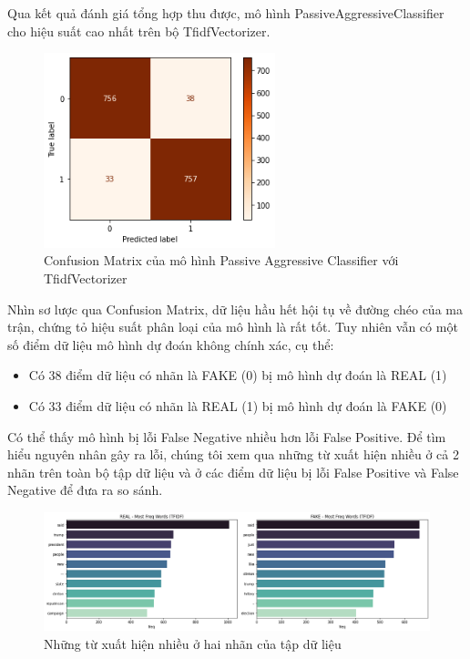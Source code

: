 \documentclass[12pt,a4paper,oneside]{book}
\begin{document}
Qua kết quả đánh giá tổng hợp thu được, mô hình PassiveAggressiveClassifier cho hiệu suất cao nhất trên bộ TfidfVectorizer.
\begin{figure}[H]
	\centering
	\captionsetup{width=0.6\textwidth}
	\includegraphics[width=0.6\textwidth]{tfpa_2}
	\caption{Confusion Matrix của mô hình Passive Aggressive Classifier với TfidfVectorizer}
\end{figure}
Nhìn sơ lược qua Confusion Matrix, dữ liệu hầu hết hội tụ về đường chéo của ma trận, chứng tỏ hiệu suất phân loại của mô hình là rất tốt. Tuy nhiên vẫn có một số điểm dữ liệu mô hình dự đoán không chính xác, cụ thể:
\begin{itemize}
\item Có 38 điểm dữ liệu có nhãn là FAKE (0) bị mô hình dự đoán là REAL (1)
\item Có 33 điểm dữ liệu có nhãn là REAL (1) bị mô hình dự đoán là FAKE (0)
\end{itemize}

Có thể thấy mô hình bị lỗi False Negative nhiều hơn lỗi False Positive.
Để tìm hiểu nguyên nhân gây ra lỗi, chúng tôi xem qua những từ xuất hiện nhiều ở cả 2 nhãn trên toàn bộ tập dữ liệu và ở các điểm dữ liệu bị lỗi False Positive và False Negative để đưa ra so sánh.
\begin{figure}[H]
	\centering
	\includegraphics[width=1\textwidth]{frequentdata}
	\caption{Những từ xuất hiện nhiều ở hai nhãn của tập dữ liệu}
\end{figure}
\end{document}
